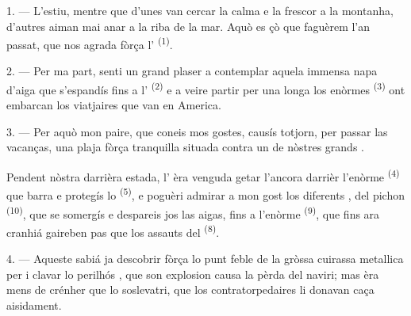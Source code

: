 %

\VUsaut{4.0mm}
\VUsaut{3.0mm}
\VUsaut{3.0mm}

1. --- L'estiu, mentre que d'unes van cercar la calma e la frescor a la montanha,
d'autres aiman mai anar a la riba de la mar. Aquò es çò que faguèrem l'an passat,
que nos agrada fòrça l' \textsuperscript{(1)}.

2. --- Per ma part, senti un grand plaser a contemplar aquela immensa napa d'aiga
que s'espandís fins a l' \textsuperscript{(2)} e a veire partir
per una longa  los enòrmes 
\textsuperscript{(3)} ont embarcan los viatjaires que van en America.

3. --- Per aquò mon paire, que coneis mos gostes, causís totjorn, per passar las
vacanças, una plaja fòrça tranquilla situada contra un de nòstres grands
.

Pendent nòstra darrièra estada, l' èra venguda getar l'ancora
darrièr l'enòrme  \textsuperscript{(4)} que barra e protegís lo
 \textsuperscript{(5)}, e poguèri admirar a mon gost los
diferents , del pichon 
\textsuperscript{(10)}, que se somergís e despareis jos las aigas, fins a l'enòrme
 \textsuperscript{(9)}, que fins ara cranhiá gaireben pas que
los assauts del  \textsuperscript{(8)}.

\VUsaut{3.0mm}
\VUsaut{3.0mm}

4. --- Aqueste sabiá ja descobrir fòrça  lo punt feble de la
gròssa cuirassa metallica per i clavar lo perilhós , que son
explosion causa la pèrda del naviri; mas èra mens de crénher que lo soslevatri,
que los contratorpedaires li donavan caça aisidament.

